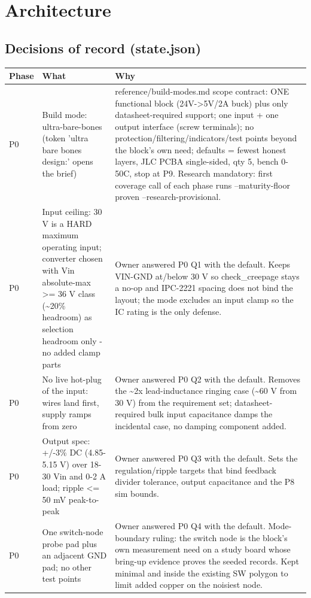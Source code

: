 \documentclass[11pt,a4paper]{article}
\begin{document}
\section{Architecture}
\subsection*{Decisions of record (state.json)}
{\small
\begin{longtable}{lp{5.2cm}p{7.2cm}}
\toprule
\textbf{Phase} & \textbf{What} & \textbf{Why} \\
\midrule
\endhead
P0 & Build mode: ultra-bare-bones (token 'ultra bare bones design:' opens the brief) & reference/build-modes.md scope contract: ONE functional block (24V-\textgreater{}5V/2A buck) plus only datasheet-required support; one input + one output interface (screw terminals); no protection/filtering/indicators/test points beyond the block's own need; defaults = fewest honest layers, JLC PCBA single-sided, qty 5, bench 0-50C, stop at P9. Research mandatory: first coverage call of each phase runs --maturity-floor proven --research-provisional. \\
P0 & Input ceiling: 30 V is a HARD maximum operating input; converter chosen with Vin absolute-max \textgreater{}= 36 V class (\textasciitilde{}20\% headroom) as selection headroom only - no added clamp parts & Owner answered P0 Q1 with the default. Keeps VIN-GND at/below 30 V so check\_creepage stays a no-op and IPC-2221 spacing does not bind the layout; the mode excludes an input clamp so the IC rating is the only defense. \\
P0 & No live hot-plug of the input: wires land first, supply ramps from zero & Owner answered P0 Q2 with the default. Removes the \textasciitilde{}2x lead-inductance ringing case (\textasciitilde{}60 V from 30 V) from the requirement set; datasheet-required bulk input capacitance damps the incidental case, no damping component added. \\
P0 & Output spec: +/-3\% DC (4.85-5.15 V) over 18-30 Vin and 0-2 A load; ripple \textless{}= 50 mV peak-to-peak & Owner answered P0 Q3 with the default. Sets the regulation/ripple targets that bind feedback divider tolerance, output capacitance and the P8 sim bounds. \\
P0 & One switch-node probe pad plus an adjacent GND pad; no other test points & Owner answered P0 Q4 with the default. Mode-boundary ruling: the switch node is the block's own measurement need on a study board whose bring-up evidence proves the seeded records. Kept minimal and inside the existing SW polygon to limit added copper on the noisiest node. \\

\end{longtable}}
\end{document}
